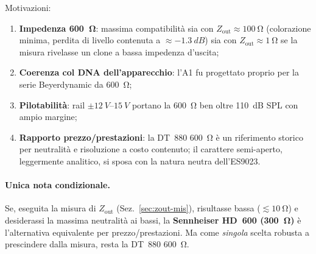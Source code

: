 \noindent Motivazioni:
\begin{enumerate}
  \item \textbf{Impedenza \SI{600}{\ohm}}: massima compatibilità sia con
        $Z_{\text{out}}\approx\SI{100}{\ohm}$ (colorazione minima, perdita
        di livello contenuta a $\approx\SI{-1.3}{dB}$) sia con
        $Z_{\text{out}}\approx\SI{1}{\ohm}$ se la misura rivelasse un
        clone a bassa impedenza d'uscita;
  \item \textbf{Coerenza col DNA dell'apparecchio}: l'A1 fu progettato
        proprio per la serie Beyerdynamic da \SI{600}{\ohm};
  \item \textbf{Pilotabilità}: rail $\pm\SIrange{12}{15}{V}$ portano la
        \SI{600}{\ohm} ben oltre \SI{110}{dB} SPL con ampio margine;
  \item \textbf{Rapporto prezzo/prestazioni}: la DT~880 \SI{600}{\ohm} è
        un riferimento storico per neutralità e risoluzione a costo
        contenuto; il carattere semi-aperto, leggermente analitico, si
        sposa con la natura neutra dell'ES9023.
\end{enumerate}

\paragraph{Unica nota condizionale.} Se, eseguita la misura di
$Z_{\text{out}}$ (Sez.~\ref{sec:zout-mis}), risultasse bassa
($\lesssim\SI{10}{\ohm}$) e desiderassi la massima neutralità ai bassi, la
\textbf{Sennheiser HD~600 (\SI{300}{\ohm})} è l'alternativa equivalente
per prezzo/prestazioni. Ma come \emph{singola} scelta robusta a
prescindere dalla misura, resta la DT~880 \SI{600}{\ohm}.

